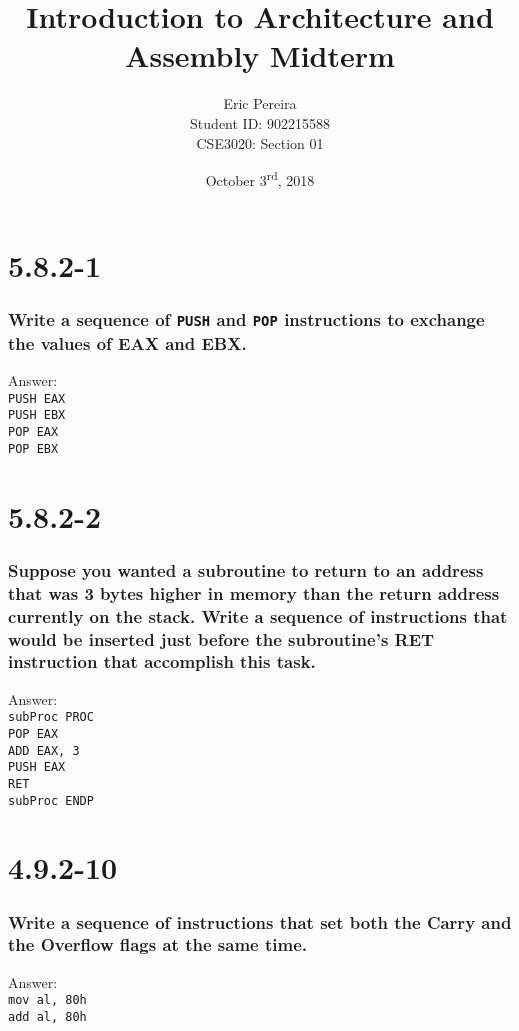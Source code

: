 \documentclass[12pt]{article}
\begin{document}
\begin{titlepage}
	

\author{Eric Pereira\\
Student ID: 902215588\\
CSE3020: Section 01}
\date{October 3\textsuperscript{rd}, 2018}
\title{Introduction to Architecture and Assembly Midterm}
\maketitle
\end{titlepage}
\tableofcontents
\newpage
{}
\section{5.8.2-1}
\subsubsection*{Write a sequence of \texttt{PUSH} and \texttt{POP} instructions to exchange the values of EAX and EBX.}
Answer: \\
\texttt{PUSH EAX \\
PUSH EBX \\
POP EAX \\
POP EBX \\}
\section{5.8.2-2}
\subsubsection*{Suppose you wanted a subroutine to return to an address that was 3 bytes higher in memory than the return address currently on the stack. Write a sequence of instructions that would be inserted just before the subroutine's RET instruction that accomplish this task.}
Answer: \\
\texttt{subProc PROC \\
	POP EAX \\
	ADD EAX, 3 \\
	PUSH EAX \\ 
	RET \\
	subProc ENDP \\}
\section{4.9.2-10}
\subsubsection*{Write a sequence of instructions that set both the Carry and the Overflow flags at the same time.}
Answer: \\
\texttt{mov al, 80h \\
	add al, 80h }
\end{document}
